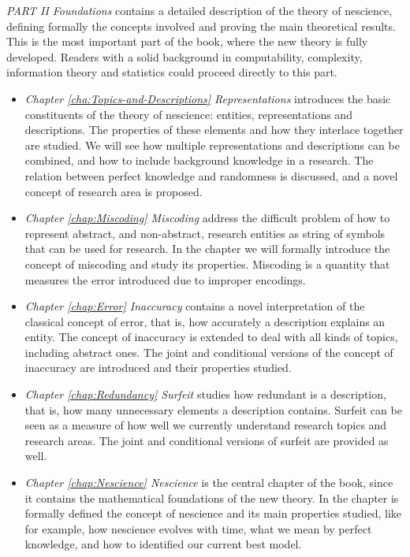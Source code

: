 \bigskip

\emph{PART II Foundations} contains a detailed description of the theory of nescience, defining formally the concepts involved and proving the main theoretical results. This is the most important part of the book, where the new theory is fully developed. Readers with a solid background in computability, complexity, information theory and statistics could proceed directly to this part.

\begin{itemize}

\item \emph{Chapter \ref{cha:Topics-and-Descriptions} Representations} introduces the basic constituents of the theory of nescience: entities, representations and descriptions. The properties of these elements and how they interlace together are studied. We will see how multiple representations and descriptions can be combined, and how to include background knowledge in a research. The relation between perfect knowledge and randomness is discussed, and a novel concept of research area is proposed.

\item \emph{Chapter \ref{chap:Miscoding} Miscoding} address the difficult problem of how to represent abstract, and non-abstract, research entities as string of symbols that can be used for research. In the chapter we will formally introduce the concept of miscoding and study its properties. Miscoding is a quantity that measures the error introduced due to improper encodings.

\item \emph{Chapter \ref{chap:Error} Inaccuracy} contains a novel interpretation of the classical concept of error, that is, how accurately a description explains an entity. The concept of inaccuracy is extended to deal with all kinds of topics, including abstract ones. The joint and conditional versions of the concept of inaccuracy are introduced and their properties studied.

\item \emph{Chapter \ref{chap:Redundancy} Surfeit} studies how redundant is a description, that is, how many unnecessary elements a description contains. Surfeit can be seen as a measure of how well we currently understand research topics and research areas. The joint and conditional versions of surfeit are provided as well.

\item \emph{Chapter \ref{chap:Nescience} Nescience} is the central chapter of the book, since it contains the mathematical foundations of the new theory. In the chapter is formally defined the concept of nescience and its main properties studied, like for example, how nescience evolves with time, what we mean by perfect knowledge, and how to identified our current best model.


\end{itemize}
